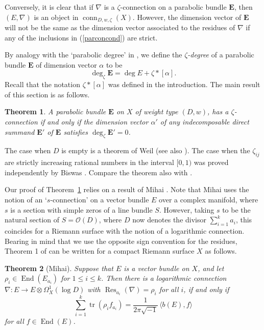 \documentclass{amsart}
\theoremstyle{plain}
\newtheorem{thm}{Theorem}[section]
\theoremstyle{definition}
\theoremstyle{remark}
\DeclareMathOperator{\tr}{tr}
\DeclareMathOperator{\End}{End}
\DeclareMathOperator{\Res}{Res}
\DeclareMathOperator{\conn}{conn}
\newcommand{\OO}{\mathcal{O}}
\newcommand{\E}{\mathbf{E}}
\begin{document}
Conversely, it is clear that if $\nabla$ is a $\zeta$-connection on a
parabolic bundle $\E$, then $(E,\nabla)$ is an object in $\conn_{D,w,\zeta}(X)$.
However, the dimension vector of $\E$ will not be the same as the dimension vector
associated to the residues of $\nabla$ if any of the inclusions in (\ref{parconcond})
are strict.

By analogy with the `parabolic degree' in \cite{MS}, we define the \emph{$\zeta$-degree}
of a parabolic bundle $\E$ of dimension vector $\alpha$ to be
\[
\deg_\zeta \E = \deg E + \zeta*[\alpha].
\]
Recall that the notation $\zeta*[\alpha]$ was defined in the introduction.
The main result of this section is as follows.

\begin{thm}\label{t:parcon}
A parabolic bundle $\E$ on $X$ of weight type $(D,w)$,
has a $\zeta$-connection if and only if
the dimension vector $\alpha'$ of any indecomposable direct summand
$\E'$ of $\E$ satisfies $\deg_\zeta \E'=0$.
\end{thm}


The case when $D$ is empty is a theorem of Weil \cite{Weil} (see also \cite[Theorem 10]{Atiyah}).
The case when the $\zeta_{ij}$ are strictly increasing rational numbers in the interval $[0,1)$
was proved independently by Biswas \cite{Biswas}.
Compare the theorem also with \cite[Theorem 3.3]{CBmm}.

Our proof of Theorem~\ref{t:parcon} relies on a result of Mihai \cite{Mihai1,Mihai2}.
Note that Mihai uses the notion of an `$s$-connection' on a vector bundle $E$
over a complex manifold, where $s$ is a section with simple zeros of a line
bundle $S$. However, taking $s$ to be the natural section of $S = \OO(D)$,
where $D$ now denotes the divisor $\sum_{i=1}^k a_i$, this coincides for a Riemann surface
with the notion of a logarithmic connection.
Bearing in mind that we use the opposite sign convention for the residues,
Theorem 1 of \cite{Mihai1,Mihai2} can
be written for a compact Riemann surface $X$ as follows.


\begin{thm}[Mihai]\label{t:mihai}
Suppose that $E$ is a vector bundle on $X$, and let $\rho_i\in \End(E_{a_i})$
for $1\le i\le k$.
Then there is a logarithmic connection
$\nabla:E\to E\otimes \Omega^1_X(\log D)$ with $\Res_{a_i}(\nabla) = \rho_i$ for all $i$,
if and only if
\[
\sum_{i=1}^k \tr(\rho_i f_{a_i}) = \frac{1}{2\pi\sqrt{-1}} \, \langle b(E),f \rangle
\]
for all $f\in\End(E)$.
\end{thm}
\end{document}
